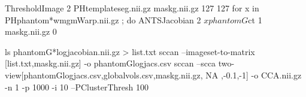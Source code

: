     ThresholdImage 2 PHtemplateseg.nii.gz  maskg.nii.gz 127 127  
    for x in PHphantom*wmgmWarp.nii.gz ; do  
      ANTSJacobian 2 $x phantomG${ct} 1 maskg.nii.gz 0  

    ls phantomG*logjacobian.nii.gz > list.txt   
    sccan --imageset-to-matrix [list.txt,maskg.nii.gz] -o phantomGlogjacs.csv   
    sccan --scca two-view[phantomGlogjacs.csv,globalvols.csv,maskg.nii.gz, NA ,-0.1,-1] -o CCA.nii.gz -n 1 -p 1000 -i 10 --PClusterThresh 100 


